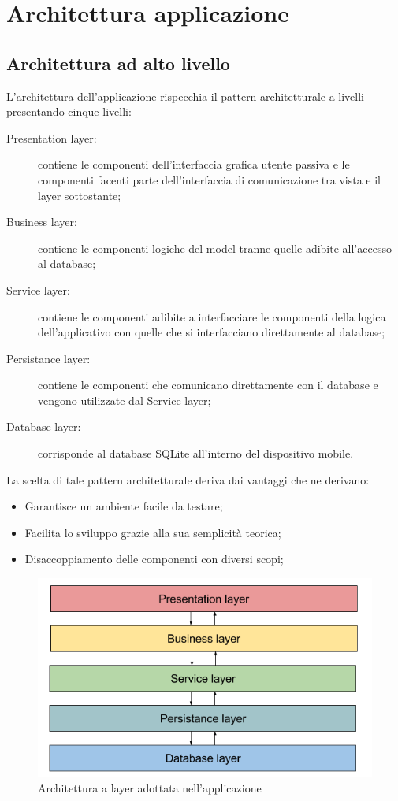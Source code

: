 \documentclass[../DefinizioneDiProdotto.tex,lanscape]{subfiles}
\begin{document}
\section{Architettura applicazione}

	\subsection{Architettura ad alto livello}
		L'architettura dell'applicazione rispecchia il pattern architetturale a livelli presentando cinque livelli:
		\begin{description}
			\item[Presentation layer:] contiene le componenti dell'interfaccia grafica utente passiva e le componenti facenti parte dell'interfaccia di comunicazione tra vista e il layer sottostante;
			\item[Business layer:] contiene le componenti logiche del model tranne quelle adibite all'accesso al database;
			\item[Service layer:] contiene le componenti adibite a interfacciare le componenti della logica dell'applicativo con quelle che si interfacciano direttamente al database;
			\item[Persistance layer:] contiene le componenti che comunicano direttamente con il database e vengono utilizzate dal Service layer; 
			\item[Database layer:] corrisponde al database SQLite all'interno del dispositivo mobile.
		\end{description}
	La scelta di tale pattern architetturale deriva dai vantaggi che ne derivano:
	\begin{itemize}
		\item Garantisce un ambiente facile da testare;
		\item Facilita lo sviluppo grazie alla sua semplicità teorica;
		\item Disaccoppiamento delle componenti con diversi scopi;
	\end{itemize}
	
	\begin{figure} [h]
		\centering
		\includegraphics[scale=0.4]{img/LayeredArchitecture}
		\caption{Architettura a layer adottata nell'applicazione}
		\label{fig:LayerArchitecture}
	\end{figure}
		
\end{document}
